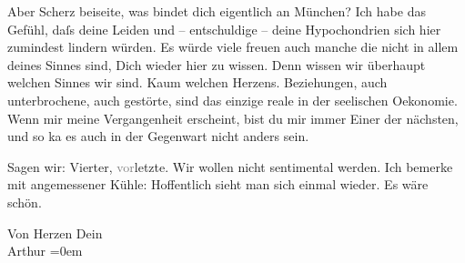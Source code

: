 \pstart
           Aber Scherz beiseite, was bindet dich eigentlich an München? Ich habe das Gefühl, daſs deine Leiden und – entschuldige – deine
               Hypochondrien sich hier zumindest lindern würden. Es würde viele freuen auch manche
               die nicht in allem deines Sinnes sind, Dich wieder hier zu wissen. Denn wissen wir
               überhaupt {\pb}welchen
               Sinnes wir sind. Kaum welchen Herzens. Beziehungen, auch unterbrochene, auch
               gestörte, sind das einzige reale in der seelischen Oekonomie. \label{LL141-1v}\label{LL141-1h}Wenn mir meine Vergangenheit erscheint, bist du mir immer Einer
               der nächsten, und so ka{\geminationn} es auch in der Gegenwart nicht
               anders sein. \pend
           
\pstart
           \label{K_L02533-2v}\label{K_L02533-2} Sagen wir: Vierter, \textcolor{gray}{vor}letzte. Wir wollen nicht
               sentimental \introOben{}werden.\introOben{} Ich bemerke mit angemessener Kühle:
               Hoffentlich sieht man sich einmal wieder. Es wäre schön.\pend
           
\pstart
           Von Herzen Dein{\\[\baselineskip]}\spacefill\mbox{Arthur}\pend
           \leftskip=0em{}\endnumbering{}  
      